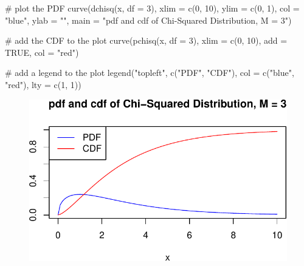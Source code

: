\documentclass[
  letterpaper,
  DIV=11,
  numbers=noendperiod]{scrreprt}
\newenvironment{Shaded}{\begin{snugshade}}{\end{snugshade}}
\newcommand{\AttributeTok}[1]{\textcolor[rgb]{0.40,0.45,0.13}{#1}}
\newcommand{\CommentTok}[1]{\textcolor[rgb]{0.37,0.37,0.37}{#1}}
\newcommand{\ConstantTok}[1]{\textcolor[rgb]{0.56,0.35,0.01}{#1}}
\newcommand{\DecValTok}[1]{\textcolor[rgb]{0.68,0.00,0.00}{#1}}
\newcommand{\FunctionTok}[1]{\textcolor[rgb]{0.28,0.35,0.67}{#1}}
\newcommand{\NormalTok}[1]{\textcolor[rgb]{0.00,0.23,0.31}{#1}}
\newcommand{\StringTok}[1]{\textcolor[rgb]{0.13,0.47,0.30}{#1}}
\theoremstyle{definition}
\theoremstyle{plain}
\theoremstyle{plain}
\theoremstyle{remark}
\begin{document}
\begin{Shaded}
\begin{Highlighting}[]
\CommentTok{\# plot the PDF}
\FunctionTok{curve}\NormalTok{(}\FunctionTok{dchisq}\NormalTok{(x, }\AttributeTok{df =} \DecValTok{3}\NormalTok{), }
      \AttributeTok{xlim =} \FunctionTok{c}\NormalTok{(}\DecValTok{0}\NormalTok{, }\DecValTok{10}\NormalTok{), }
      \AttributeTok{ylim =} \FunctionTok{c}\NormalTok{(}\DecValTok{0}\NormalTok{, }\DecValTok{1}\NormalTok{), }
      \AttributeTok{col =} \StringTok{"blue"}\NormalTok{,}
      \AttributeTok{ylab =} \StringTok{""}\NormalTok{,}
      \AttributeTok{main =} \StringTok{"pdf and cdf of Chi{-}Squared Distribution, M = 3"}\NormalTok{)}

\CommentTok{\# add the CDF to the plot}
\FunctionTok{curve}\NormalTok{(}\FunctionTok{pchisq}\NormalTok{(x, }\AttributeTok{df =} \DecValTok{3}\NormalTok{), }
      \AttributeTok{xlim =} \FunctionTok{c}\NormalTok{(}\DecValTok{0}\NormalTok{, }\DecValTok{10}\NormalTok{), }
      \AttributeTok{add =} \ConstantTok{TRUE}\NormalTok{, }
      \AttributeTok{col =} \StringTok{"red"}\NormalTok{)}

\CommentTok{\# add a legend to the plot}
\FunctionTok{legend}\NormalTok{(}\StringTok{"topleft"}\NormalTok{, }
       \FunctionTok{c}\NormalTok{(}\StringTok{"PDF"}\NormalTok{, }\StringTok{"CDF"}\NormalTok{), }
       \AttributeTok{col =} \FunctionTok{c}\NormalTok{(}\StringTok{"blue"}\NormalTok{, }\StringTok{"red"}\NormalTok{), }
       \AttributeTok{lty =} \FunctionTok{c}\NormalTok{(}\DecValTok{1}\NormalTok{, }\DecValTok{1}\NormalTok{))}
\end{Highlighting}
\end{Shaded}

\begin{figure}[H]

{\centering \includegraphics{./02-Review-Prob_n_Stats_files/figure-pdf/unnamed-chunk-12-1.pdf}

}

\end{figure}
\end{document}
